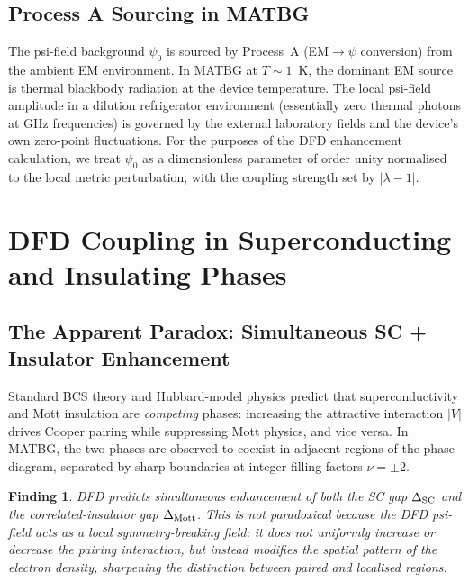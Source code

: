 \documentclass[11pt]{article}
\newtheorem{finding}{Finding}
\newcommand{\nuFill}{\nu}
\newcommand{\Vmott}{\Delta_{\rm Mott}}
\begin{document}
\subsection{Process A Sourcing in MATBG}

The psi-field background $\psi_0$ is sourced by Process~A (EM$\to\psi$
conversion) from the ambient EM environment. In MATBG at $T \sim 1$~K, the
dominant EM source is thermal blackbody radiation at the device temperature.
The local psi-field amplitude in a dilution refrigerator environment
(essentially zero thermal photons at GHz frequencies) is governed by the
external laboratory fields and the device's own zero-point fluctuations.
For the purposes of the DFD enhancement calculation, we treat $\psi_0$ as
a dimensionless parameter of order unity normalised to the local metric
perturbation, with the coupling strength set by $|\lambda-1|$.

\section{DFD Coupling in Superconducting and Insulating Phases}
\label{sec:dual_phase}

\subsection{The Apparent Paradox: Simultaneous SC + Insulator Enhancement}

Standard BCS theory and Hubbard-model physics predict that superconductivity
and Mott insulation are \emph{competing} phases: increasing the attractive
interaction $|V|$ drives Cooper pairing while suppressing Mott physics, and
vice versa. In MATBG, the two phases are observed to coexist in adjacent
regions of the phase diagram, separated by sharp boundaries at integer
filling factors $\nuFill = \pm 2$.

\begin{finding}
  \label{find:simultaneous}
  DFD predicts \emph{simultaneous} enhancement of both the SC gap
  $\Delta_{\rm SC}$ and the correlated-insulator gap $\Vmott$. This is
  not paradoxical because the DFD psi-field acts as a \emph{local
  symmetry-breaking field}: it does not uniformly increase or decrease
  the pairing interaction, but instead modifies the \emph{spatial pattern}
  of the electron density, sharpening the distinction between paired and
  localised regions.
\end{finding}
\end{document}
